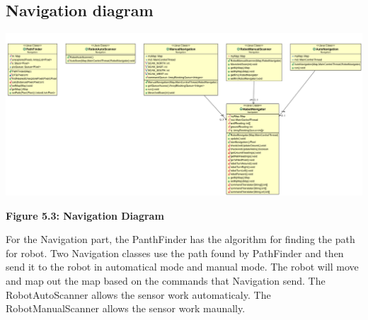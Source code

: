 \documentclass[11pt, a4paper]{report}
\begin{document}
\subsection{Navigation diagram}
 \begin{center}
 \includegraphics[width=18.20cm]{Navigation.png}
\end{center}
\begin{center}
\textbf {Figure 5.3: Navigation Diagram} \\[0.3cm]
\end{center}
For the Navigation part, the PanthFinder has the algorithm for finding the path for robot. Two Navigation classes use the path found by PathFinder and then send it to the robot in automatical mode and manual mode. The robot will move and map out the map based on the  commands that Navigation send. The RobotAutoScanner allows the sensor work automaticaly. The RobotManualScanner allows the sensor work maunally.
\pagebreak
\end{document}
